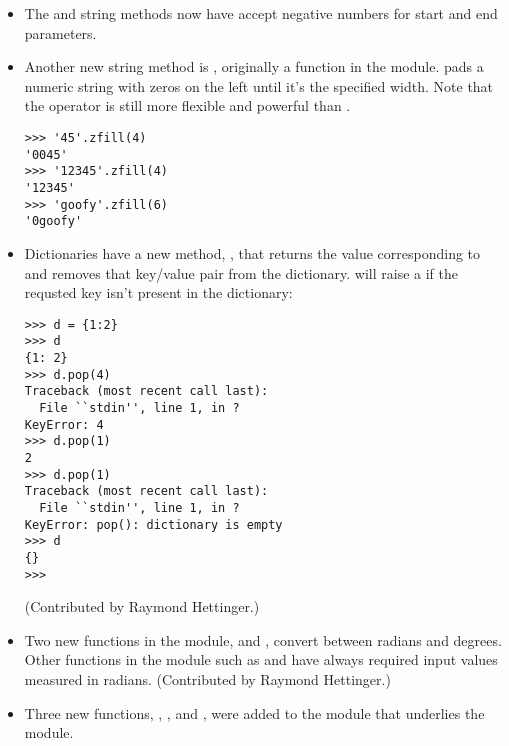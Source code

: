 \documentclass{howto}
\begin{document}
\begin{itemize}
\begin{verbatim}
>>> '   abc '.strip()
'abc'
>>> '><><abc<><><>'.strip('<>')
'abc'
>>> '><><abc<><><>\n'.strip('<>')
'abc<><><>\n'
>>> u'\u4000\u4001abc\u4000'.strip(u'\u4000')
u'\u4001abc'
>>>
\end{verbatim}

\item The  and 
string methods now have accept negative numbers for
start and end parameters.

\item Another new string method is , originally a
function in the  module.   pads a
numeric string with zeros on the left until it's the specified width.
Note that the \code{\%} operator is still more flexible and powerful
than .

\begin{verbatim}
>>> '45'.zfill(4)
'0045'
>>> '12345'.zfill(4)
'12345'
>>> 'goofy'.zfill(6)
'0goofy'
\end{verbatim}

\item Dictionaries have a new method, , that
returns the value corresponding to  and removes that
key/value pair from the dictionary.   will raise a
 if the requsted key isn't present in the
dictionary:

\begin{verbatim}
>>> d = {1:2}
>>> d
{1: 2}
>>> d.pop(4)
Traceback (most recent call last):
  File ``stdin'', line 1, in ?
KeyError: 4
>>> d.pop(1)
2
>>> d.pop(1)
Traceback (most recent call last):
  File ``stdin'', line 1, in ?
KeyError: pop(): dictionary is empty
>>> d
{}
>>>
\end{verbatim}

(Contributed by Raymond Hettinger.)

\item Two new functions in the  module, 
 and ,
convert between radians and degrees.  Other functions in the 
 module such as
 and  have always required
input values measured in radians. (Contributed by Raymond Hettinger.)

\item Three new functions, , ,
and , were added to the  module that
underlies the  module.


\end{itemize}
\end{document}
